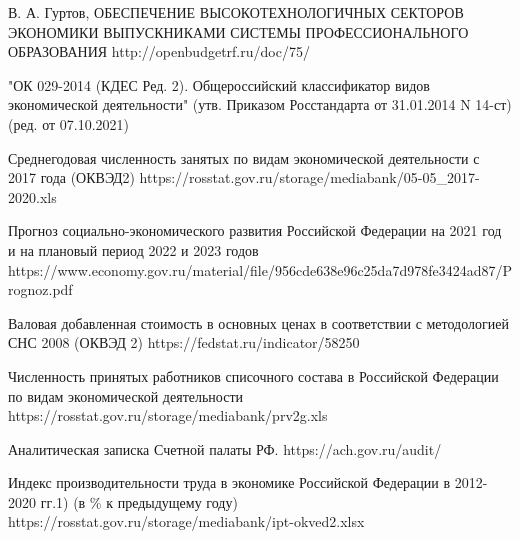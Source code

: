 \begingroup 
\renewcommand{\section}[2]{\anonsection{Библиографический список}}
\begin{flushleft}
\begin{thebibliography}{}

	
    В. А. Гуртов, ОБЕСПЕЧЕНИЕ ВЫСОКОТЕХНОЛОГИЧНЫХ СЕКТОРОВ ЭКОНОМИКИ ВЫПУСКНИКАМИ СИСТЕМЫ ПРОФЕССИОНАЛЬНОГО ОБРАЗОВАНИЯ
    http://openbudgetrf.ru/doc/75/
    
    "ОК 029-2014 (КДЕС Ред. 2). Общероссийский классификатор видов экономической деятельности" (утв. Приказом Росстандарта от 31.01.2014 N 14-ст) (ред. от 07.10.2021)

	Среднегодовая численность занятых по видам экономической деятельности с 2017 года (ОКВЭД2) https://rosstat.gov.ru/storage/mediabank/05-05\_2017-2020.xls
	
	Прогноз социально-экономического развития Российской Федерации на 2021 год и на плановый период 2022 и 2023 годов
	https://www.economy.gov.ru/material/file/956cde638e96c25da7d978fe3424ad87/Prognoz.pdf
	
	Валовая добавленная стоимость в основных ценах в соответствии с методологией СНС 2008 (ОКВЭД 2) https://fedstat.ru/indicator/58250
	
	Численность принятых работников списочного состава в Российской Федерации по видам экономической деятельности https://rosstat.gov.ru/storage/mediabank/prv2g.xls
	
	Аналитическая записка Счетной палаты РФ. https://ach.gov.ru/audit/
	
	Индекс производительности труда в экономике Российской Федерации в 2012-2020 гг.1)
	(в \% к предыдущему году)
	https://rosstat.gov.ru/storage/mediabank/ipt-okved2.xlsx
	
\end{thebibliography}
\end{flushleft}
\endgroup

\clearpage
